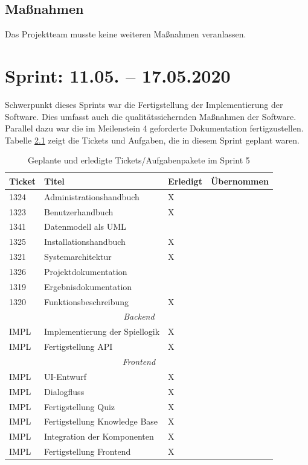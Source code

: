 \documentclass[a4paper,11pt,listof=numbered,glossary=totoc,parskip=half,toc=bib]{scrreprt}
\begin{document}
    \section{Maßnahmen}
    Das Projektteam musste keine weiteren Maßnahmen veranlassen.
    
    \chapter{Sprint: 11.05. – 17.05.2020}
 Schwerpunkt dieses Sprints war die Fertigstellung der Implementierung der Software. Dies umfasst auch die qualitätssichernden Maßnahmen der Software. Parallel dazu war die im Meilenstein 4 geforderte Dokumentation fertigzustellen. Tabelle \ref{tab:sprint5} zeigt die Tickets und Aufgaben, die in diesem Sprint geplant waren.
  
 \begin{table}   
    \begin{tabularx}{\textwidth}{lXll}
			\toprule
			\textbf{Ticket} & \textbf{Titel} & \textbf{Erledigt} & \textbf{Übernommen} \\
			\midrule
1324	&	Administrationshandbuch	&	X	&		\\
1323	&	Benutzerhandbuch	&	X	&		\\
1341	&	Datenmodell als UML	&		&		\\
1325	&	Installationshandbuch	&	X	&		\\
1321	&	Systemarchitektur	&	X	&		\\
1326	&	Projektdokumentation	&		&		\\
1319	&	Ergebnisdokumentation	&		&		\\
1320	&	Funktionsbeschreibung	&	X	&		\\

					\midrule
		\multicolumn{4}{c}{\textit{Backend}}\\
		\midrule
IMPL	&	Implementierung der Spiellogik	&	X	&		\\
IMPL	&	Fertigstellung API	&	X	&		\\
		\midrule
		\multicolumn{4}{c}{\textit{Frontend}}\\
		\midrule
IMPL	&	UI-Entwurf	&	X	&		\\
IMPL	&	Dialogfluss	&	X	&		\\
IMPL	&	Fertigstellung Quiz	&	X	&		\\
IMPL	&	Fertigstellung Knowledge Base	&	X	&		\\
IMPL	&	Integration der Komponenten	&	X	&		\\
IMPL	&	Fertigstellung Frontend	&	X	&		\\

			\bottomrule
		\end{tabularx}
\caption{Geplante und erledigte Tickets/Aufgabenpakete im Sprint 5}
\label{tab:sprint5}
\end{table}
    
\end{document}
